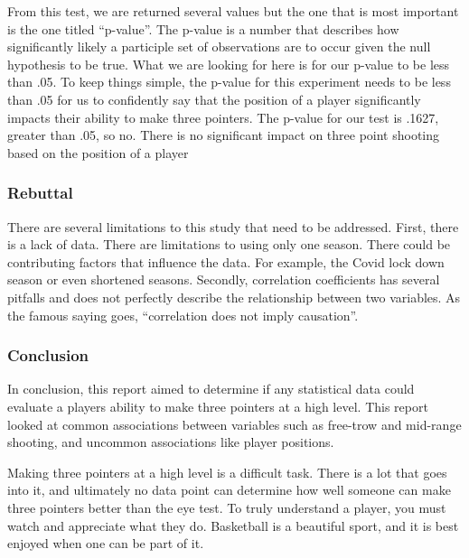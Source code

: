 \documentclass[
]{article}
\begin{document}
From this test, we are returned several values but the one that is most
important is the one titled ``p-value''. The p-value is a number that
describes how significantly likely a participle set of observations are
to occur given the null hypothesis to be true. What we are looking for
here is for our p-value to be less than .05. To keep things simple, the
p-value for this experiment needs to be less than .05 for us to
confidently say that the position of a player significantly impacts
their ability to make three pointers. The p-value for our test is .1627,
greater than .05, so no. There is no significant impact on three point
shooting based on the position of a player

\subsubsection{\texorpdfstring{\textbf{Rebuttal}}{Rebuttal}}\label{rebuttal}

There are several limitations to this study that need to be addressed.
First, there is a lack of data. There are limitations to using only one
season. There could be contributing factors that influence the data. For
example, the Covid lock down season or even shortened seasons. Secondly,
correlation coefficients has several pitfalls and does not perfectly
describe the relationship between two variables. As the famous saying
goes, ``correlation does not imply causation''.

\subsubsection{\texorpdfstring{\textbf{Conclusion}}{Conclusion}}\label{conclusion}

In conclusion, this report aimed to determine if any statistical data
could evaluate a players ability to make three pointers at a high level.
This report looked at common associations between variables such as
free-trow and mid-range shooting, and uncommon associations like player
positions.

Making three pointers at a high level is a difficult task. There is a
lot that goes into it, and ultimately no data point can determine how
well someone can make three pointers better than the eye test. To truly
understand a player, you must watch and appreciate what they do.
Basketball is a beautiful sport, and it is best enjoyed when one can be
part of it.
\end{document}
